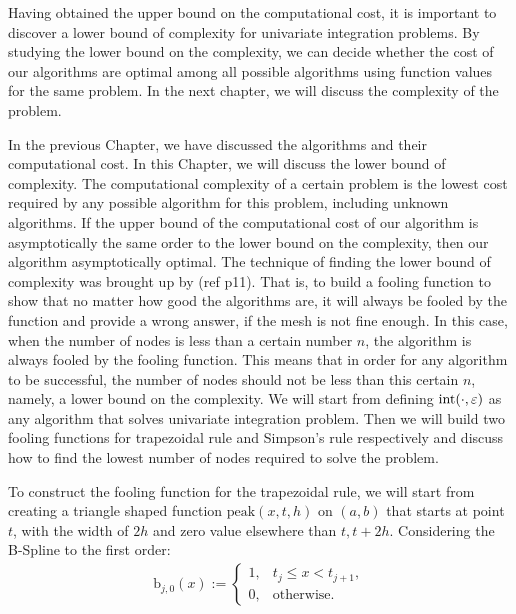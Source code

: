 \documentclass{iitthesis}
\theoremstyle{definition}
\theoremstyle{remark}
\begin{document}
Having obtained the upper bound on the computational cost, it is important to discover a lower bound of complexity for univariate integration problems. By studying the lower bound on the complexity, we can decide whether the cost of our algorithms are optimal among all possible algorithms using function values for the same problem. In the next chapter, we will discuss the complexity of the problem.


In the previous Chapter, we have discussed the algorithms and their computational cost. In this Chapter, we will discuss the lower bound of complexity. The computational complexity of a certain problem is the lowest cost required by any possible algorithm for this problem, including unknown algorithms. If the upper bound of the computational cost of our algorithm is asymptotically the same order to the lower bound on the complexity, then our algorithm asymptotically optimal. The technique of finding the lower bound of complexity was brought up by (ref p11). That is, to build a fooling function to show that no matter how good the algorithms are, it will always be fooled by the function and provide a wrong answer, if the mesh is not fine enough. In this case, when the number of nodes is less than a certain number $n$, the algorithm is always fooled by the fooling function. This means that in order for any algorithm to be successful, the number of nodes should not be less than this certain $n$, namely, a lower bound on the complexity. We will start from defining $\textup{int}(\cdot,\varepsilon)$ as any algorithm that solves univariate integration problem. Then we will build two fooling functions for trapezoidal rule and Simpson's rule respectively and discuss how to find the lowest number of nodes required to solve the problem.


To construct the fooling function for the trapezoidal rule, we will start from creating a triangle shaped function $\text{peak}(x,t,h)$ on $(a,b)$ that starts at point $t$, with the width of $2h$ and zero value elsewhere than $t, t+2h$. Considering the B-Spline to the first order:
\begin{align*}
  \text{b}_{j,0}(x):= \begin{cases} \displaystyle 1, & t_{j} \le x < t_{j+1},\\[1ex]
\displaystyle  0, & \text{otherwise}.
\end{cases}
\end{align*}
\end{document}
